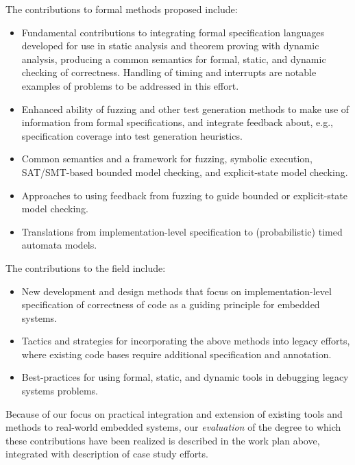 The contributions to formal methods proposed include:

\begin{itemize}
\item Fundamental contributions to integrating formal specification
languages developed for use in static analysis and theorem proving
with dynamic analysis, producing a common semantics for formal,
static, and dynamic checking of correctness.  Handling of timing and
interrupts are notable examples of problems to be addressed in this effort.
\item Enhanced ability of fuzzing and other test generation methods to
make use of information from formal specifications, and integrate
feedback about, e.g., specification coverage into test generation
heuristics.
\item Common semantics and a framework for fuzzing, symbolic execution, SAT/SMT-based
bounded model checking, and explicit-state model checking.
\item Approaches to using feedback from fuzzing to guide bounded or explicit-state model
checking.
\item Translations from implementation-level specification to
(probabilistic) timed automata models.
\end{itemize}

The contributions to the field include:


\begin{itemize}
\item New development and design methods that focus on
implementation-level specification of correctness of code as a guiding
principle for embedded systems.
\item Tactics and strategies for incorporating the above methods into
legacy efforts, where existing code bases require additional
specification and annotation.
\item Best-practices for using formal, static, and dynamic tools in
debugging legacy systems problems.
\end{itemize}


Because of our focus on practical integration and extension of
existing tools and methods to real-world embedded systems,
our \emph{evaluation} of the degree to which these contributions have
been realized is described in the work plan above, integrated with
description of case study efforts.